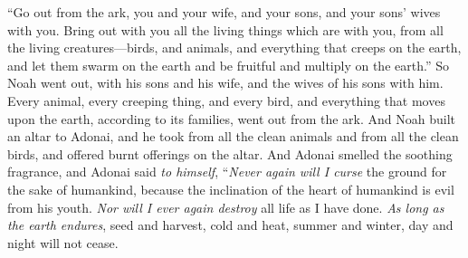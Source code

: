 \begin{biblechapter}
\verse “Go out from the ark, you and your wife, and your sons, and your sons’ wives with you.
\verse Bring out with you all the living things which are with you, from all the living creatures—birds, and animals, and everything that creeps on the earth, and let them swarm on the earth and be fruitful and multiply on the earth.”
\verse So Noah went out, with his sons and his wife, and the wives of his sons with him.
\verse Every animal, every creeping thing, and every bird, and everything that moves upon the earth, according to its families, went out from the ark.
\verse And Noah built an altar to Adonai, and he took from all the clean animals and from all the clean birds, and offered burnt offerings on the altar.
\verse And Adonai smelled the soothing fragrance, and Adonai said \textit{to himself}, “\textit{Never again will I curse} the ground for the sake of humankind, because the inclination of the heart of humankind is evil from his youth. \textit{Nor will I ever again destroy} all life as I have done.
\verse \textit{As long as the earth endures}, seed and harvest, cold and heat, summer and winter, day and night will not cease.
\end{biblechapter}

